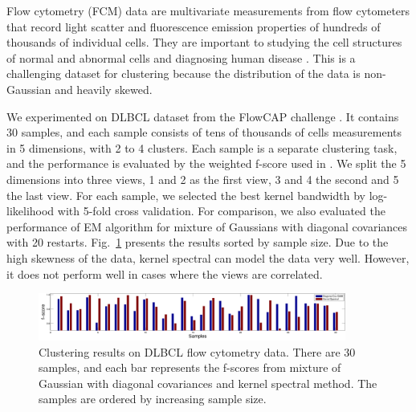 
Flow cytometry (FCM) data are multivariate measurements from flow cytometers that record light scatter and fluorescence emission properties of hundreds of thousands of individual cells. They are important to studying the cell structures of normal and abnormal cells and diagnosing human disease \cite{cytometry_nature}. This is a challenging dataset for clustering because the distribution of the data is non-Gaussian and heavily skewed.

We experimented on DLBCL dataset from the FlowCAP challenge \cite{cytometry_nature}. It contains 30 samples, and each sample consists of tens of thousands of cells measurements in 5 dimensions, with 2 to 4 clusters. Each sample is a separate clustering task, and the performance is evaluated by the weighted f-score used in \cite{cytometry_nature}. We split the 5 dimensions into three views, 1 and 2 as the first view, 3 and 4 the second and 5 the last view. For each sample, we selected the best kernel bandwidth by log-likelihood with 5-fold cross validation. For comparison, we also evaluated the performance of EM algorithm for mixture of Gaussians with diagonal covariances with 20 restarts. Fig.~\ref{fig:real_data} presents the results sorted by sample size. Due to the high skewness of the data, kernel spectral can model the data very well. However, it does not perform well in cases where the views are correlated. 


\begin{figure}
  \centering
  \includegraphics[width=0.9\textwidth]{../experiment/figure/paired_bar_chat} 
   \vspace{-3mm}
  \caption{Clustering results on DLBCL flow cytometry data. There are 30 samples, and each bar represents the f-scores from mixture of Gaussian with diagonal covariances and kernel spectral method. The samples are ordered by increasing sample size.}\label{fig:real_data}
  \vspace{-3mm}
\end{figure}
